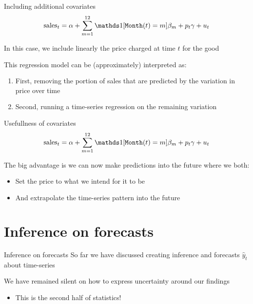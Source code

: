 \documentclass[aspectratio=169,t,11pt,table]{beamer}
\begin{document}
\begin{frame}{Including additional covariates}
  \vspace*{-\bigskipamount}
  $$
    \text{sales}_t = \alpha + \sum_{m = 1}^{12} \one{\texttt{Month}(t) = m} \beta_m + p_t \gamma + u_t
  $$

  In this case, we include linearly the price charged at time $t$ for the good

  \pause
  \bigskip
  This regression model can be (approximately) interpreted as:
  \begin{enumerate}
    \item First, removing the portion of sales that are predicted by the variation in price over time
    
    \item Second, running a time-series regression on the remaining variation
  \end{enumerate}
\end{frame}

\begin{frame}{Usefullness of covariates}
  \vspace*{-\bigskipamount}
  $$
    \text{sales}_t = \alpha + \sum_{m = 1}^{12} \one{\texttt{Month}(t) = m} \beta_m + p_t \gamma + u_t
  $$

  The big advantage is we can now make predictions into the future where we both:
  \begin{itemize}
    \item Set the price to what we intend for it to be
    \item And extrapolate the time-series pattern into the future
  \end{itemize}  
\end{frame}


\section{Inference on forecasts}

\begin{frame}{Inference on forecasts}
  So far we have discussed creating inference and forecasts $\hat{y}_t$ about time-series

  \bigskip
  We have remained silent on how to express uncertainty around our findings
  \begin{itemize}
    \item This is the second half of statistics!
  \end{itemize}
\end{frame}
\end{document}
